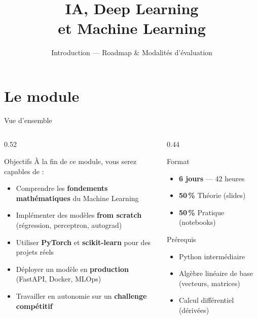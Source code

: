 \documentclass[aspectratio=169, 10pt]{beamer}
\title[IA, Deep Learning et Machine Learning]{IA, Deep Learning\\ et Machine Learning}
\subtitle{Introduction --- Roadmap \& Modalités d'évaluation}
\date{}
\begin{document}

\begin{frame}
  \titlepage
\end{frame}

\section{Le module}

\begin{frame}{Vue d'ensemble}
  \begin{columns}[T]
    \begin{column}{0.52\textwidth}
      \begin{block}{Objectifs}
        À la fin de ce module, vous serez capables de :
        \begin{itemize}
          \item Comprendre les \textbf{fondements mathématiques}
                du Machine Learning
          \item Implémenter des modèles \textbf{from scratch}
                (régression, perceptron, autograd)
          \item Utiliser \textbf{PyTorch} et \textbf{scikit-learn}
                pour des projets réels
          \item Déployer un modèle en \textbf{production}
                (FastAPI, Docker, MLOps)
          \item Travailler en autonomie sur un
                \textbf{challenge compétitif}
        \end{itemize}
      \end{block}
    \end{column}
    \begin{column}{0.44\textwidth}
      \begin{exampleblock}{Format}
        \begin{itemize}
          \item \textbf{6 jours} --- 42 heures
          \item \textbf{50\,\%} Théorie (slides)
          \item \textbf{50\,\%} Pratique (notebooks)
        \end{itemize}
      \end{exampleblock}
      \smallskip
      \begin{block}{Prérequis}
        \begin{itemize}
          \item Python intermédiaire
          \item Algèbre linéaire de base
                (vecteurs, matrices)
          \item Calcul différentiel (dérivées)
        \end{itemize}
      \end{block}
    \end{column}
  \end{columns}
\end{frame}
\end{document}
